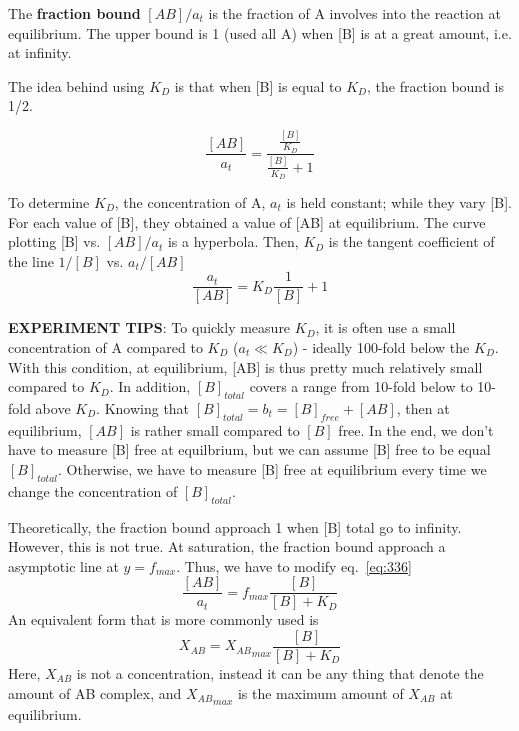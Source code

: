 The {\bf fraction bound} $[AB]/a_t$ is the fraction of A involves into the
reaction at equilibrium. The upper bound is 1 (used all A) when [B] is
at a great amount, i.e. at infinity. 

\begin{framed}
  The idea behind using $K_D$ is that when [B] is equal to $K_D$, the
  fraction bound is 1/2.


  \begin{equation}
    \label{eq:337}
    \frac{[AB]}{a_t} = \frac{\frac{[B]}{K_D}}{\frac{[B]}{K_D}+1}  
  \end{equation}
\end{framed}

To determine $K_D$, the concentration of A, $a_t$ is held constant;
while they vary [B]. For each value of [B], they obtained a value of
[AB] at equilibrium. The curve plotting [B] vs. $[AB]/a_t$ is a hyperbola. 
Then, $K_D$ is the tangent coefficient of the line $1/[B]$ vs. $a_t/[AB]$
\begin{equation}
  \label{eq:338}
   \frac{a_t}{[AB]}= K_D\frac{1}{[B]} + 1
\end{equation}

{\bf EXPERIMENT TIPS}: To quickly measure $K_D$, it is often use a
small concentration of A compared to $K_D$ ($a_t\ll K_D$) - ideally
100-fold below the $K_D$. With this condition, at equilibrium, [AB] is
thus pretty much relatively small compared to $K_D$.  In addition,
$[B]_{total}$ covers a range from 10-fold below to 10-fold above
$K_D$.  Knowing that $[B]_{total}=b_t=[B]_{free}+[AB]$, then at
equilibrium, $[AB]$ is rather small compared to $[B]$ free. In the
end, we don't have to measure [B] free at equilbrium, but we can
assume [B] free to be equal $[B]_{total}$. Otherwise, we have to
measure [B] free at equilibrium every time we change the concentration
of $[B]_{total}$. 

Theoretically, the fraction bound approach 1 when [B] total go to
infinity. However, this is not true. At saturation, the fraction bound
approach a asymptotic line at $y=f_{max}$. Thus, we have to modify
eq.~\eqref{eq:336}
\begin{equation}
  \label{eq:339}
   \frac{[AB]}{a_t} = f_{max}\frac{[B]}{[B]+K_D}
\end{equation}
An equivalent form that is more commonly used is
\begin{equation}
  \label{eq:340}
    X_{AB}= {X_{AB}}_{max}\frac{[B]}{[B]+K_D}
\end{equation}
Here, $X_{AB}$ is not a concentration, instead it can be any thing
that denote the amount of AB complex, and ${X_{AB}}_{max}$ is the maximum
amount of $X_{AB}$ at equilibrium. 


